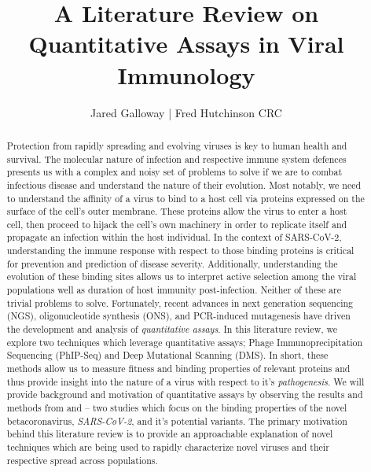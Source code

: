\documentclass{article}
\title{A Literature Review on Quantitative Assays in Viral Immunology}
\author{Jared Galloway | Fred Hutchinson CRC}
\begin{document}
\maketitle

\begin{abstract}
Protection from rapidly spreading and evolving viruses is key to human health and survival.
The molecular nature of infection and respective immune system defences presents us with a complex and noisy set of problems to solve if we are to combat infectious disease and understand the nature of their evolution.
Most notably, we need to understand the affinity of a virus to bind to a host cell via proteins expressed on the surface of the cell's outer membrane.
These proteins allow the virus to enter a host cell, then proceed to hijack the cell's own machinery in order to replicate itself and propagate an infection within the host individual.
In the context of SARS-CoV-2, understanding the immune response with respect to those binding proteins is critical for prevention and prediction of disease severity.
Additionally, understanding the evolution of these binding sites allows us to interpret active selection among the viral populations well as duration of host immunity post-infection.
Neither of these are trivial problems to solve.
Fortunately, recent advances in next generation sequencing (NGS), oligonucleotide synthesis (ONS), and PCR-induced mutagenesis have driven the development and analysis of \textit{quantitative assays}. 
In this literature review, we explore two techniques which leverage quantitative assays; Phage Immunoprecipitation Sequencing (PhIP-Seq) and Deep Mutational Scanning (DMS).
In short, these methods allow us to measure fitness and binding properties of relevant proteins and thus provide insight into the nature of a virus with respect to it's \textit{pathogenesis}.
We will provide background and motivation of quantitative assays by observing the results and methods from \citet{Shrock2020} and \citet{Starr2020} -- 
two studies which focus on the binding properties of the novel betacoronavirus, \textit{SARS-CoV-2}, and it's potential variants.
The primary motivation behind this literature review is to provide an approachable explanation of novel techniques which are being used to rapidly characterize novel viruses and their respective spread across populations.
\end{abstract}
\end{document}
